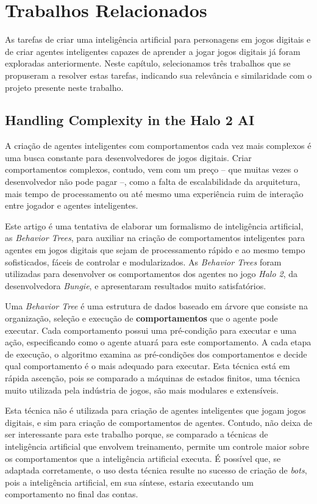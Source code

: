 \chapter{\label{chap:related-work}Trabalhos Relacionados}
As tarefas de criar uma inteligência artificial para personagens em jogos
digitais e de criar agentes inteligentes capazes de aprender a jogar jogos
digitais já foram exploradas anteriormente. Neste capítulo, selecionamos três
trabalhos que se propuseram a resolver estas tarefas, indicando sua relevância e
similaridade com o projeto presente neste trabalho. 


\section{Handling Complexity in the Halo 2 AI}
A criação de agentes inteligentes com comportamentos cada vez mais complexos é
uma busca constante para desenvolvedores de jogos digitais. Criar comportamentos
complexos, contudo, vem com um preço -- que muitas vezes o desenvolvedor não
pode pagar --, como a falta de escalabilidade da arquitetura, mais tempo de
processamento ou até mesmo uma experiência ruim de interação entre jogador e
agentes inteligentes.

Este artigo é uma tentativa de elaborar um formalismo de inteligência
artificial, as \textit{Behavior Trees}, para auxiliar na criação de
comportamentos inteligentes para agentes em jogos digitais que sejam de
processamento rápido e ao mesmo tempo sofisticados, fáceis de controlar e
modularizados. As \textit{Behavior Trees} foram utilizadas para desenvolver os
comportamentos dos agentes no jogo \textit{Halo 2}, da desenvolvedora
\textit{Bungie}, e apresentaram resultados muito satisfatórios\cite{Halo2AI}.

Uma \textit{Behavior Tree} é uma estrutura de dados baseado em árvore que
consiste na organização, seleção e execução de \textbf{comportamentos} que o
agente pode executar. Cada comportamento possui uma pré-condição para executar e
uma ação, especificando como o agente atuará para este comportamento. A cada
etapa de execução, o algoritmo examina as pré-condições dos comportamentos e
decide qual comportamento é o mais adequado para executar. Esta técnica está em
rápida ascenção, pois se comparado a máquinas de estados finitos, uma técnica
muito utilizada pela indústria de jogos, são mais modulares e
extensíveis\cite{Rabin:2015:GAP:2821138}.

Esta técnica não é utilizada para criação de agentes inteligentes que jogam
jogos digitais, e sim para criação de comportamentos de agentes. Contudo, não
deixa de ser interessante para este trabalho porque, se comparado a técnicas de
inteligência artificial que envolvem treinamento, permite um controle maior
sobre os comportamentos que a inteligência artificial executa. É possível que,
se adaptada corretamente, o uso desta técnica resulte no sucesso de criação de
\textit{bots}, pois a inteligência artificial, em sua síntese, estaria
executando um comportamento no final das contas.


